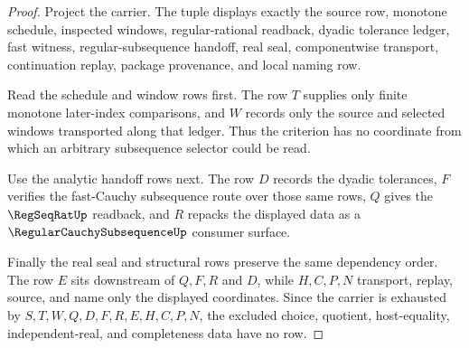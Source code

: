 \begin{proof}
Project the carrier. The tuple displays exactly the source row, monotone schedule, inspected windows, regular-rational readback, dyadic tolerance ledger, fast witness, regular-subsequence handoff, real seal, componentwise transport, continuation replay, package provenance, and local naming row.

Read the schedule and window rows first. The row $T$ supplies only finite monotone later-index comparisons, and $W$ records only the source and selected windows transported along that ledger. Thus the criterion has no coordinate from which an arbitrary subsequence selector could be read.

Use the analytic handoff rows next. The row $D$ records the dyadic tolerances, $F$ verifies the fast-Cauchy subsequence route over those same rows, $Q$ gives the $\RegSeqRatUp$ readback, and $R$ repacks the displayed data as a $\RegularCauchySubsequenceUp$ consumer surface.

Finally the real seal and structural rows preserve the same dependency order. The row $E$ sits downstream of $Q,F,R$ and $D$, while $H,C,P,N$ transport, replay, source, and name only the displayed coordinates. Since the carrier is exhausted by $S,T,W,Q,D,F,R,E,H,C,P,N$, the excluded choice, quotient, host-equality, independent-real, and completeness data have no row.
\end{proof}

